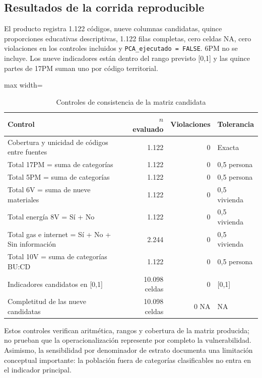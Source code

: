 \subsection{Resultados de la corrida reproducible}

El producto  registra 1.122 códigos, nueve columnas candidatas, quince proporciones educativas descriptivas, 1.122 filas completas, cero celdas NA, cero violaciones en los controles incluidos y \texttt{PCA\_ejecutado = FALSE}. 6PM no se incluye. Los nueve indicadores están dentro del rango previsto [0,1] y las quince partes de 17PM suman uno por código territorial.

\begin{table}[htbp]
\centering\small
\caption{Controles de consistencia de la matriz candidata}\label{tab:controles_matriz}
\begin{adjustbox}{max width=\textwidth}
\begin{tabular}{@{}p{}r r p{}@{}}
\toprule
\textbf{Control} & \textbf{$n$ evaluado} & \textbf{Violaciones} & \textbf{Tolerancia}\\
\midrule
Cobertura y unicidad de códigos entre fuentes & 1.122 & 0 & Exacta \\
Total 17PM = suma de categorías & 1.122 & 0 & 0,5 persona \\
Total 5PM = suma de categorías & 1.122 & 0 & 0,5 persona \\
Total 6V = suma de nueve materiales & 1.122 & 0 & 0,5 vivienda \\
Total energía 8V = Sí + No & 1.122 & 0 & 0,5 vivienda \\
Total gas e internet = Sí + No + Sin información & 2.244 & 0 & 0,5 vivienda \\
Total 10V = suma de categorías BU:CD & 1.122 & 0 & 0,5 persona \\
Indicadores candidatos en [0,1] & 10.098 celdas & 0 & [0,1] \\
Completitud de las nueve candidatas & 10.098 celdas & 0 NA & NA \\
\bottomrule
\end{tabular}
\end{adjustbox}
\end{table}

Estos controles verifican aritmética, rangos y cobertura de la matriz producida; no prueban que la operacionalización represente por completo la vulnerabilidad. Asimismo, la sensibilidad por denominador de estrato documenta una limitación conceptual importante: la población fuera de categorías clasificables no entra en el indicador principal.

